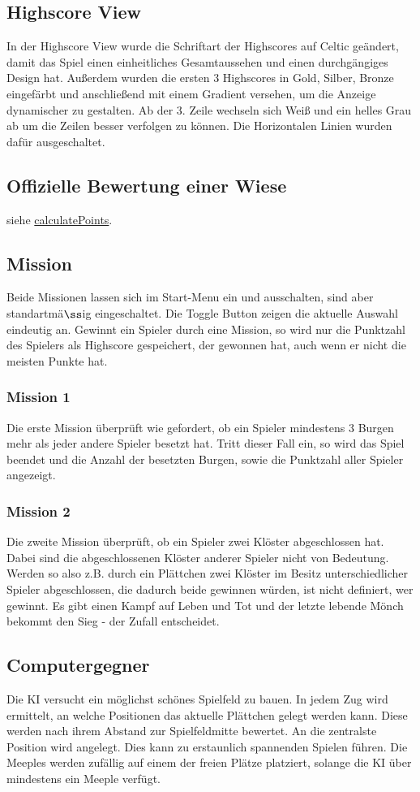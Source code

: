 \documentclass{article}
\begin{document}
\subsection{Highscore View}
In der Highscore View wurde die Schriftart der Highscores auf Celtic geändert, damit das Spiel einen einheitliches Gesamtaussehen und einen durchgängiges Design hat. Außerdem wurden die ersten 3 Highscores in Gold, Silber, Bronze eingefärbt und anschließend mit einem Gradient versehen, um die Anzeige dynamischer zu gestalten. Ab der 3. Zeile wechseln sich Weiß und ein helles Grau ab um die Zeilen besser verfolgen zu können. Die Horizontalen Linien wurden dafür ausgeschaltet.

\subsection{Offizielle Bewertung einer Wiese}
siehe \hyperref[sec:calculatePoints]{calculatePoints}.

\subsection{Mission}
Beide Missionen lassen sich im Start-Menu ein und ausschalten, sind aber standartm\"a$\ss$ig eingeschaltet. Die Toggle Button zeigen die aktuelle Auswahl eindeutig an.
Gewinnt ein Spieler durch eine Mission, so wird nur die Punktzahl des Spielers als Highscore gespeichert, der gewonnen hat, auch wenn er nicht die meisten Punkte hat.

\subsubsection{Mission 1}
Die erste Mission \"uberpr\"uft wie gefordert, ob ein Spieler mindestens 3 Burgen mehr als jeder andere Spieler besetzt hat. Tritt dieser Fall ein, so wird das Spiel beendet und die Anzahl der besetzten Burgen, sowie die Punktzahl aller Spieler angezeigt.

\subsubsection{Mission 2}
Die zweite Mission \"uberpr\"uft, ob ein Spieler zwei Kl\"oster abgeschlossen hat. Dabei sind die abgeschlossenen Kl\"oster anderer Spieler nicht von Bedeutung. Werden so also z.B. durch ein Pl\"attchen zwei Kl\"oster im Besitz unterschiedlicher Spieler abgeschlossen, die dadurch beide gewinnen w\"urden, ist nicht definiert, wer gewinnt. Es gibt einen Kampf auf Leben und Tot und der letzte lebende M\"onch bekommt den Sieg - der Zufall entscheidet.

\subsection{Computergegner}
Die KI versucht ein m\"oglichst sch\"ones Spielfeld zu bauen. In jedem Zug wird ermittelt, an welche Positionen das aktuelle Pl\"attchen gelegt werden kann. Diese werden nach ihrem Abstand zur Spielfeldmitte bewertet. An die zentralste Position wird angelegt. Dies kann zu erstaunlich spannenden Spielen f\"uhren. Die Meeples werden zuf\"allig auf einem der freien Pl\"atze platziert, solange die KI \"uber mindestens ein Meeple verf\"ugt.
\end{document}
